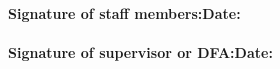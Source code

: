 \documentclass[a4paper,12pt,oneside, landscape]{article}\usepackage[]{graphicx}\usepackage[]{color}
\begin{document}
\textbf{Signature of staff members:}\hspace*{6.25cm}\textbf{Date:}\\\\
\textbf{Signature of supervisor or DFA:}\hspace*{6.25cm}\textbf{Date:}

\end{document}

